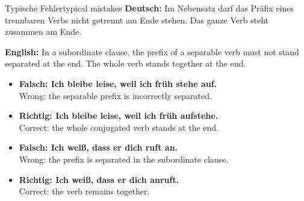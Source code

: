 \documentclass[a4paper,11pt]{article}
\newcommand{\GermanText}[1]{\textbf{Deutsch: }#1\par}
\newcommand{\EnglishText}[1]{{\small\color{SoftGray}\textbf{English: }#1\par}}
\newcommand{\ExampleItem}[2]{\item \textbf{#1}\\{\small\color{SoftGray}#2}}
\begin{document}
        \begin{grammarentry}{Typische Fehler}{typical mistakes}
            \GermanText{Im Nebensatz darf das Präfix eines trennbaren Verbs nicht getrennt am Ende stehen. Das ganze Verb steht zusammen am Ende.}
            \EnglishText{In a subordinate clause, the prefix of a separable verb must not stand separated at the end. The whole verb stands together at the end.}
            
            \begin{exbox}
                \begin{itemize}
                    \ExampleItem{Falsch: Ich bleibe leise, weil ich früh stehe auf.}{Wrong: the separable prefix is incorrectly separated.}
                    \ExampleItem{Richtig: Ich bleibe leise, weil ich früh aufstehe.}{Correct: the whole conjugated verb stands at the end.}
                    \ExampleItem{Falsch: Ich weiß, dass er dich ruft an.}{Wrong: the prefix is separated in the subordinate clause.}
                    \ExampleItem{Richtig: Ich weiß, dass er dich anruft.}{Correct: the verb remains together.}
                \end{itemize}
            \end{exbox}
        \end{grammarentry}
\end{document}
